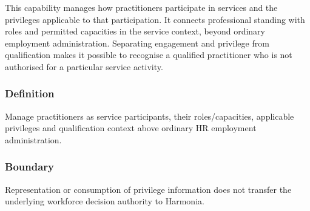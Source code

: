 This capability manages how practitioners participate in services and the privileges applicable to that participation. It connects professional standing with roles and permitted capacities in the service context, beyond ordinary employment administration. Separating engagement and privilege from qualification makes it possible to recognise a qualified practitioner who is not authorised for a particular service activity.

\subsubsection*{Definition}

Manage practitioners as service participants, their roles/\allowbreak{}capacities, applicable privileges and qualification context above ordinary HR employment administration.

\subsubsection*{Boundary}

Representation or consumption of privilege information does not transfer the underlying workforce decision authority to Harmonia.


